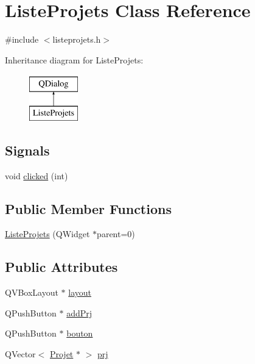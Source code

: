 \hypertarget{class_liste_projets}{}\section{Liste\+Projets Class Reference}
\label{class_liste_projets}


{\ttfamily \#include $<$listeprojets.\+h$>$}

Inheritance diagram for Liste\+Projets\+:\begin{figure}[H]
\begin{center}
\leavevmode
\includegraphics[height=2.000000cm]{class_liste_projets}
\end{center}
\end{figure}
\subsection*{Signals}
\begin{DoxyCompactItemize}
\item 
void \hyperlink{class_liste_projets_ac5a81b7b05afd8678cf82899e1504266}{clicked} (int)
\end{DoxyCompactItemize}
\subsection*{Public Member Functions}
\begin{DoxyCompactItemize}
\item 
\hyperlink{class_liste_projets_a069a958b17e8a03352716875bcd7fe80}{Liste\+Projets} (Q\+Widget $\ast$parent=0)
\end{DoxyCompactItemize}
\subsection*{Public Attributes}
\begin{DoxyCompactItemize}
\item 
Q\+V\+Box\+Layout $\ast$ \hyperlink{class_liste_projets_a5e745a69ba95eeae29269022a08becc4}{layout}
\item 
Q\+Push\+Button $\ast$ \hyperlink{class_liste_projets_ad38087a7e6e7f418ced454ad24f3db72}{add\+Prj}
\item 
Q\+Push\+Button $\ast$ \hyperlink{class_liste_projets_a0c34df5d18031dd6830eac4e7c3ee9ac}{bouton}
\item 
Q\+Vector$<$ \hyperlink{class_projet}{Projet} $\ast$ $>$ \hyperlink{class_liste_projets_a675688a1c030d0555daf8d968eaae50c}{prj}
\end{DoxyCompactItemize}
